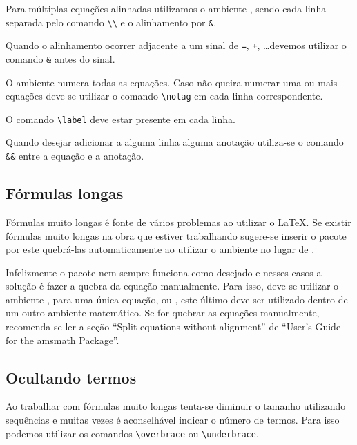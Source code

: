 Para múltiplas equações alinhadas utilizamos o ambiente
, sendo cada linha separada
pelo comando \lstinline!\\! e o alinhamento por
\lstinline!&!. \\

Quando o alinhamento ocorrer adjacente a um sinal de \lstinline!=!,
\lstinline!+!, \dots devemos utilizar o comando \lstinline!&! antes do sinal.

O ambiente  numera todas as equações. Caso não queira numerar uma
ou mais equações deve-se utilizar o comando \lstinline!\notag! em cada linha
correspondente.

O comando \lstinline!\label! deve estar presente em cada linha.

Quando desejar adicionar a alguma linha alguma anotação utiliza-se o comando
\lstinline!&&! entre a equação e a anotação. \\

\subsection{Fórmulas longas}
Fórmulas muito longas é fonte de vários problemas ao utilizar o LaTeX. Se
existir fórmulas muito longas na obra que estiver trabalhando sugere-se inserir
o pacote  por este quebrá-las automaticamente ao utilizar o
ambiente  no lugar de .

Infelizmente o pacote  nem sempre funciona como desejado e nesses
casos a solução é fazer a quebra da equação manualmente. Para isso, deve-se
utilizar o ambiente , para uma única equação, ou
, este último deve ser utilizado dentro de um outro ambiente
matemático. Se for quebrar as equações manualmente, recomenda-se ler a seção
``Split equations without alignment'' de ``User’s Guide for the amsmath Package''.

\subsection{Ocultando termos}
Ao trabalhar com fórmulas muito longas tenta-se diminuir o tamanho utilizando
sequências e muitas vezes é aconselhável indicar o número de termos. Para isso
podemos utilizar os comandos \lstinline!\overbrace! ou \lstinline!\underbrace!.
\\

